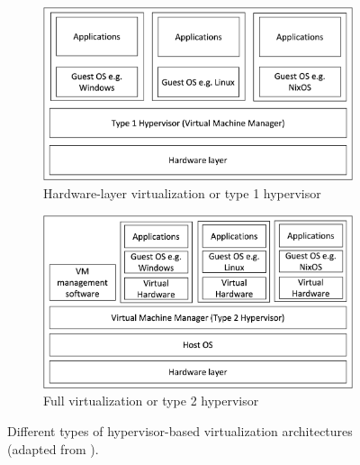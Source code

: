 \begin{figure}
\begin{subfigure}[t]{0.49\textwidth}
\centering
\includegraphics[width=\textwidth]{thesis/graphics/hardware-layer-virtualization.png} 
\caption{Hardware-layer virtualization or type 1 hypervisor}
\label{fig:Hypervisor-type-1}
\end{subfigure}
\begin{subfigure}[t]{0.49\textwidth}
\centering
\includegraphics[width=\textwidth]{thesis/graphics/full-virtualization.png}
\caption{Full virtualization or type 2 hypervisor}
\label{fig:Hypervisor-type-2}
\end{subfigure}

\caption{Different types of hypervisor-based virtualization architectures (adapted from \cite{Sahoo2010}).}
\label{fig:Virtualization}
\end{figure}

